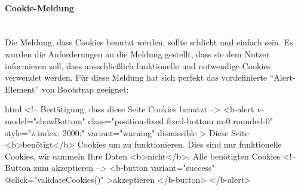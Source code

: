 \paragraph{Cookie-Meldung}
~\\
Die Meldung, dass Cookies benutzt werden, sollte schlicht und einfach sein. Es wurden die Anforderungen an die Meldung gestellt, dass sie dem Nutzer informieren soll, dass ausschließlich funktionelle und notwendige Cookies verwendet werden. Für diese Meldung hat sich perfekt das vordefinierte \enquote{Alert-Element} von Bootstrap geeignet:
\makeatletter
\begin{code}{html}
	<!-- Bestätigung, dass diese Seite Cookies benutzt -->
	<b-alert
		v-model="showBottom"
		class="position-fixed fixed-bottom m-0 rounded-0"
		style="z-index: 2000;"
		variant="warning"
		dismissible
	>
		Diese Seite <b>benötigt</b> Cookies um zu funktionieren. Dies sind nur
		funktionelle Cookies, wir sammeln Ihre Daten <b>nicht</b>. Alle benötigten
		Cookies
		<!-- Button zum akzeptieren -->
		<b-button variant="success" @click="validateCookies()"
			>akzeptieren
		</b-button>
	</b-alert>
\end{code}
\makeatother
{}
	\label{list:cookiehtml} ~\\
\newpage
